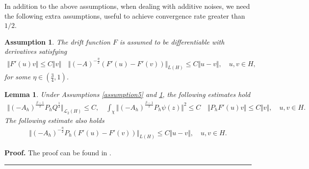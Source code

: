 \documentclass[review,12pt]{elsarticle}
\newtheorem{Assumption}{Assumption}[section]
\newtheorem{lemma}{Lemma}[section]
\newenvironment{proof}[1][Proof]{\textbf{#1.} }{\hspace{\stretch{1}}\rule{0.5em}{0.5em}}
\begin{document}
    
 In addition to the above assumptions, when dealing with additive noises, we need the following extra assumptions, useful to achieve convergence rate greater than $1/2$.
\begin{Assumption}
\label{assumption7} 
The drift function $F$ is assumed to be differentiable with derivatives satisfying
\begin{eqnarray}
\Vert F'(u)v\Vert\leq C\Vert v\Vert\quad \Vert (-A)^{-\frac{\eta}{2}}\left(F'(u)-F'(v)\right)\Vert_{L(H)}\leq C\Vert u-v\Vert,\quad 
u,v\in H, 
\end{eqnarray}
for some $\eta\in\left(\frac{3}{4}, 1\right)$. 
\end{Assumption}
\begin{lemma}
\label{distlemma}
Under Assumptions \ref{assumption5} and \ref{assumption7}, the following estimates hold
\begin{eqnarray}
\label{distes1}
\Vert (-A_h)^{\frac{\beta-1}{2}}P_hQ^{\frac{1}{2}}\Vert_{\mathcal{L}_2(H)}\leq C,\quad \int_{\chi}\Vert (-A_h)^{\frac{\beta-1}{2}}P_h\psi(z)\Vert^2\leq C\quad \Vert P_hF'(u)v\Vert\leq C\Vert v\Vert,\quad u, v\in H.
\end{eqnarray}
 The following estimate also holds
 \begin{eqnarray*}
 \Vert (-A_h)^{-\frac{\eta}{2}}P_h\left(F'(u)-F'(v)\right)\Vert_{L(H)}\leq C\Vert u-v\Vert,\quad 
u,v\in H.
 \end{eqnarray*}
\end{lemma}
\begin{proof}
The proof  can be found in \cite[(63) \& (65)]{Antonio2}. 
\end{proof}
\end{document}
